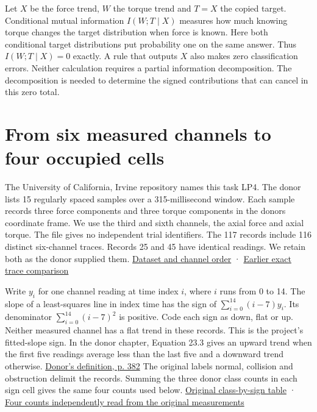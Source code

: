 Let \(X\) be the force trend, \(W\) the torque trend and \(T=X\) the copied target. Conditional mutual information \(I(W;T\mid X)\) measures how much knowing torque changes the target distribution when force is known. Here both conditional target distributions put probability one on the same answer. Thus \(I(W;T\mid X)=0\) exactly. A rule that outputs \(X\) also makes zero classification errors. Neither calculation requires a partial information decomposition. The decomposition is needed to determine the signed contributions that can cancel in this zero total.

\clearpage

\section{From six measured channels to four occupied cells}\label{from-six-measured-channels-to-four-occupied-cells}

The University of California, Irvine repository names this task LP4. The donor lists 15 regularly spaced samples over a 315-millisecond window. Each sample records three force components and three torque components in the donor\textquotesingle s coordinate frame. We use the third and sixth channels, the axial force and axial torque. The file gives no independent trial identifiers. The 117 records include 116 distinct six-channel traces. Records 25 and 45 have identical readings. We retain both as the donor supplied them. \href{https://archive.ics.uci.edu/dataset/138/robot+execution+failures}{Dataset and channel order} · \href{https://github.com/sepahead/pid-rs/blob/main/audit/research/robot-wrist-slope-signs/EXPOSITION.md}{Earlier exact trace comparison}

Write \(y_i\) for one channel reading at time index \(i\), where \(i\) runs from 0 to 14. The slope of a least-squares line in index time has the sign of \(\sum_{i=0}^{14}(i-7)y_i\). Its denominator \(\sum_{i=0}^{14}(i-7)^2\) is positive. Code each sign as down, flat or up. Neither measured channel has a flat trend in these records. This is the project's fitted-slope sign. In the donor chapter, Equation 23.3 gives an upward trend when the first five readings average less than the last five and a downward trend otherwise. \href{https://doi.org/10.1007/978-1-4615-5725-8_23}{Donor's definition, p. 382} The original labels normal, collision and obstruction delimit the records. Summing the three donor class counts in each sign cell gives the same four counts used below. \href{https://github.com/sepahead/pid-rs/blob/main/audit/research/robot-wrist-slope-signs/EXPOSITION.md}{Original class-by-sign table} · \href{https://github.com/sepahead/pid-rs/blob/main/audit/research/robot-wrist-copied-target/checked/support-ordinary.json}{Four counts independently read from the original measurements}

